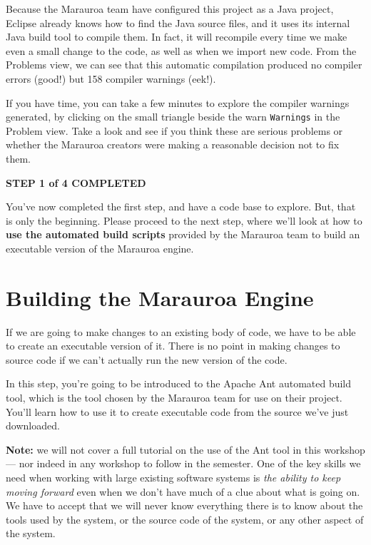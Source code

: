 \documentclass[
]{book}
\begin{document}
Because the Marauroa team have configured this project as a Java project, Eclipse already knows how to find the Java source files, and it uses its internal Java build tool to compile them. In fact, it will recompile every time we make even a small change to the code, as well as when we import new code. From the Problems view, we can see that this automatic compilation produced no compiler errors (good!) but 158 compiler warnings (eek!).

If you have time, you can take a few minutes to explore the compiler warnings generated, by clicking on the small triangle beside the warn \texttt{Warnings} in the Problem view. Take a look and see if you think these are serious problems or whether the Marauroa creators were making a reasonable decision not to fix them.

\textbf{STEP 1 of 4 COMPLETED}

You've now completed the first step, and have a code base to explore. But, that is only the beginning. Please proceed to the next step, where we'll look at how to \textbf{use the automated build scripts} provided by the Marauroa team to build an executable version of the Marauroa engine.

\hypertarget{building-the-marauroa-engine}{%
\section{Building the Marauroa Engine}\label{building-the-marauroa-engine}}

If we are going to make changes to an existing body of code, we have to be able to create an executable version of it. There is no point in making changes to source code if we can't actually run the new version of the code.

In this step, you're going to be introduced to the Apache Ant automated build tool, which is the tool chosen by the Marauroa team for use on their project. You'll learn how to use it to create executable code from the source we've just downloaded.

\textbf{Note:} we will not cover a full tutorial on the use of the Ant tool in this workshop --- nor indeed in any workshop to follow in the semester. One of the key skills we need when working with large existing software systems is \emph{the ability to keep moving forward} even when we don't have much of a clue about what is going on. We have to accept that we will never know everything there is to know about the tools used by the system, or the source code of the system, or any other aspect of the system.
\end{document}
